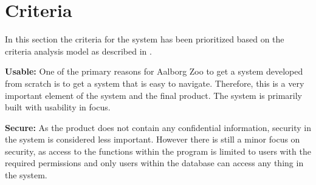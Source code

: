 \section{Criteria} \label{sc:criteria}
In this section the criteria for the system has been prioritized based on the criteria analysis model as described in \cite[chap 9]{OOAD}.

\begin{table}[H]
    \centering
    \caption{Checklist for prioritizing design criteria}
    \label{tab:my_label}
\end{table}

\textbf{Usable:} One of the primary reasons for Aalborg Zoo to get a system developed from scratch is to get a system that is easy to navigate. Therefore, this is a very important element of the system and the final product. The system is primarily built with usability in focus.

\textbf{Secure:} As the product does not contain any confidential information, security in the system is considered less important. However there is still a minor focus on security, as access to the functions within the program is limited to users with the required permissions and only users within the database can access any thing in the system.

